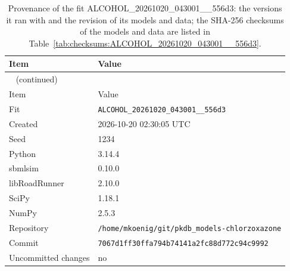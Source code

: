 \begin{longtable}{ll}
\caption{Provenance of the fit ALCOHOL\_20261020\_043001\_\_556d3: the versions it ran with and the revision of its models and data; the SHA-256 checksums of the models and data are listed in Table~\ref{tab:checksums:ALCOHOL_20261020_043001__556d3}.}\label{tab:provenance:ALCOHOL_20261020_043001__556d3} \\
\toprule
Item & Value \\
\midrule
\endfirsthead
\multicolumn{2}{l}{\small\tablename~\thetable{} (continued)} \\
\toprule
Item & Value \\
\midrule
\endhead
\bottomrule
\endlastfoot
Fit & \texttt{ALCOHOL\_20261020\_043001\_\_556d3} \\
Created & 2026-10-20 02:30:05 UTC \\
Seed & 1234 \\
Python & 3.14.4 \\
sbmlsim & 0.10.0 \\
libRoadRunner & 2.10.0 \\
SciPy & 1.18.1 \\
NumPy & 2.5.3 \\
Repository & \texttt{/home/mkoenig/git/pkdb\_models-chlorzoxazone} \\
Commit & \texttt{7067d1ff30ffa794b74141a2fc88d772c94c9992} \\
Uncommitted changes & no \\
\end{longtable}



